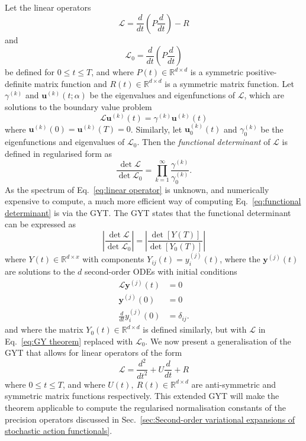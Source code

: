 \documentclass[]{cam-thesis}
\begin{document}
Let the linear operators
\begin{equation}
\mathcal{L}=\frac{d}{dt}\left(P\frac{d}{dt}\right)-R\label{eq:linear operator}
\end{equation}
and
\begin{equation}
\mathcal{L}_{0}=\frac{d}{dt}\left(P\frac{d}{dt}\right)\label{eq:free linear operator}
\end{equation}
be defined for $0\leq t\leq T$, and where $P(t)\in\mathbb{R}^{d\times d}$
is a symmetric positive-definite matrix function and $R(t)\in\mathbb{R}^{d\times d}$
is a symmetric matrix function. Let $\gamma^{(k)}$ and $\mathbf{u}^{(k)}(t;\alpha)$
be the eigenvalues and eigenfunctions of $\mathcal{L}$, which are
solutions to the boundary value problem
\begin{equation}
\mathcal{L}\mathbf{u}^{(k)}(t)=\gamma^{(k)}\mathbf{u}^{(k)}(t)\label{eq:eigenfunction eq}
\end{equation}
where $\mathbf{u}^{(k)}(0)=\mathbf{u}^{(k)}(T)=0$. Similarly, let
$\mathbf{u}_{0}^{(k)}(t)$ and $\gamma_{0}^{(k)}$ be the eigenfunctions
and eigenvalues of $\mathcal{L}_{0}$. Then the \emph{functional determinant}
of $\mathcal{L}$ is defined in regularised form as
\begin{equation}
\frac{\det\mathcal{L}}{\det\mathcal{L}_{0}}=\prod_{k=1}^{\infty}\frac{\gamma^{(k)}}{\gamma_{0}^{(k)}}.\label{eq:functional determinant}
\end{equation}
As the spectrum of Eq.~\ref{eq:linear operator} is unknown, and
numerically expensive to compute, a much more efficient way of computing
Eq.~\ref{eq:functional determinant} is via the GYT.
The GYT states that the functional determinant can be expressed as
\begin{equation}
\left|\frac{\det\mathcal{L}}{\det\mathcal{L}_{0}}\right|=\left|\frac{\det\left[Y(T)\right]}{\det\left[Y_{0}(T)\right]}\right|\label{eq:GY result}
\end{equation}
where $Y(t)\in\mathbb{R}^{d\times x}$ with components $Y_{ij}(t)=y_{i}^{(j)}(t)$,
where the $\mathbf{y}^{(j)}(t)$ are solutions to the $d$ second-order
ODEs with initial conditions
\begin{align} 
\mathcal{L}\mathbf{y}^{(j)}(t) & =0\label{eq:GY theorem}\\
\mathbf{y}^{(j)}(0) & =0\\
\frac{d}{dt}y_{i}^{(j)}(0) & =\delta_{ij}.
\end{align}
and where the matrix $Y_{0}(t)\in\mathbb{R}^{d\times d}$
is defined similarly, but with $\mathcal{L}$ in Eq.~\ref{eq:GY theorem}
replaced with $\mathcal{L}_{0}$. We now present a generalisation of the GYT that allows for linear operators of the form
\begin{equation} \label{eq:extended GYT form operator}
\mathcal{L}=\frac{d^{2}}{dt^{2}}+U\frac{d}{dt}+R
\end{equation}
where $0\leq t\leq T$, and where $U(t),\ R(t)\in\mathbb{R}^{d\times d}$
are anti-symmetric and symmetric matrix functions respectively. This extended GYT will make the theorem applicable to compute the regularised normalisation constants of the precision operators discussed in Sec.~\ref{sec:Second-order variational expansions of stochastic action functionals}.
\end{document}
